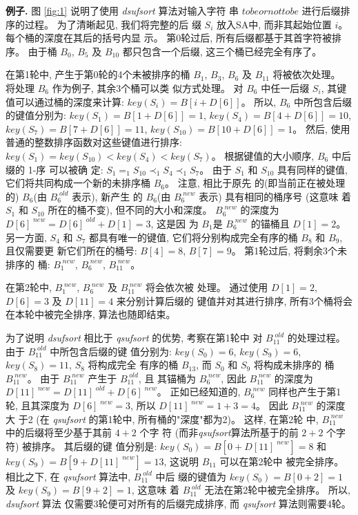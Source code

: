 \textbf{例子.} 图 \ref{fig:1} 说明了使用 \emph{dsufsort} 算法对输入字符
串 $tobeornottobe$ 进行后缀排序的过程。 为了清晰起见, 我们将完整的后
缀 $S_i$ 放入SA中, 而非其起始位置 $i$。 每个桶的深度在其后的括号内显
示。 第0轮过后, 所有后缀都基于其首字符被排序。 由于桶 $B_0$,
$B_5$ 及 $B_{10}$ 都只包含一个后缀, 这三个桶已经完全有序了。

在第1轮中, 产生于第0轮的4个未被排序的桶 $B_1$, $B_3$,
$B_6$ 及 $B_{11}$ 将被依次处理。 将处理 $B_6$ 作为例子, 其余3个桶可以类
似方式处理。 对 $B_6$ 中任一后缀 $S_i$, 其键值可以通过桶的深度来计算:
$key(S_i) = B[i+D[6]]$。 所以, $B_6$ 中所包含后缀的键值分别为:
$key(S_1) = B[1+D[6]] = 1$, $key(S_4) = B[4+D[6]] = 10$,
$key(S_7) = B[7+D[6]] = 11$, $key(S_{10}) = B[10+D[6]] = 1$。 然后, 使用
普通的整数排序函数对这些键值进行排序: $key(S_1) = key(S_{10}) <
key(S_4) < key(S_7)$。  根据键值的大小顺序, $B_6$ 中后缀的 1-序 可以被确
定: $S_1 =_ 1 S_{10} \prec_1 S_4 \prec_1 S_7$。 由于 $S_1$ 和 $S_{10}$
具有同样的键值, 它们将共同构成一个新的未排序桶 $B_6$。 注意, 相比于原先
的(即当前正在被处理的) $B_6$(由 $B_6^{\;old}$ 表示), 新产生
的 $B_6$(由 $B_6^{\;new}$ 表示) 具有相同的桶序号 (这意味
着 $S_1$ 和 $S_{10}$ 所在的桶不变), 但不同的大小和深度。 $B_6^{\;new}$
的深度为 $D[6]^{\;new} = D[6]^{\;old} + D[1] = 3$, 这是因
为 $B_1$是 $B_6^{\;new}$ 的锚桶且 $D[1] = 2$。 另一方面, $S_4$ 和 $S_7$
都具有唯一的键值, 它们将分别构成完全有序的桶 $B_8$ 和 $B_9$, 且仅需要更
新它们所在的桶号: $B[4] = 8$, $B[7] = 9$。 第1轮过后, 将剩余3个未排序的
桶: $B_1^{\;new}$, $B_6^{\;new}$, $B_{11}^{\;new}$。

在第2轮中, $B_1^{\;new}$, $B_6^{\;new}$ 及 $B_{11}^{\;new}$ 将会依次被
处理。 通过使用 $D[1] = 2$, $D[6] = 3$ 及 $D[11] = 4$ 来分别计算后缀的
键值并对其进行排序, 所有3个桶将会在本轮中被完全排序, 算法也随即结束。

为了说明 \emph{dsufsort} 相比于 \emph{qsufsort} 的优势, 考察在第1轮中
对 $B_{11}^{\;old}$ 的处理过程。 由于 $B_{11}^{\;old}$ 中所包含后缀的键
值分别为: $key(S_0)=6$, $key(S_9)=6$, $key(S_8) = 11$, $S_8$ 将构成完全
有序的桶 $B_{13}$, 而 $S_0$ 和 $S_9$ 将构成未排序的
桶 $B_{11}^{\;new}$。 由于 $B_{11}^{\;new}$ 产生于 $B_{11}^{\;old}$, 且
其锚桶为 $B_6^{\;new}$, 因此 $B_{11}^{\;new}$ 的深度为
$D[11]^{\;new} = D[11]^{\;old} + D[6]^{\;new}$。 正如已经知道的,
$B_6^{\;new}$ 同样也产生于第1轮, 且其深度为 $D[6]^{\;new} =
3$, 所以 $D[11]^{\;new} = 1 + 3 = 4$。 因此 $B_{11}^{\;new}$ 的深度大
于2 (在 \emph{qsufsort} 的第1轮中, 所有桶的"深度"都为2)。 这样, 在第2轮
中, $B_{11}^{\;new}$ 中的后缀将至少基于其前 $4+2$ 个字
符 (而非\emph{qsufsort}算法所基于的前 $2+2$ 个字符) 被排序。 其后缀的键
值分别是: $key(S_0)=B[0+D[11] ^{\;new}]=
8$ 和 $key(S_9)=B[9+D[11]^{\;new}]= 13$, 这说明 $B_{11}$ 可以在第2轮中
被完全排序。 相比之下, 在 \emph{qsufsort} 算法中, $B_{11}^{\;old}$ 中后
缀的键值为 $key(S_0) = B[0+2] = 1$ 及 $key(S_9) = B[9+2] = 1$, 这意味
着 $B_{11}^{\;old}$ 无法在第2轮中被完全排序。 所以, \emph{dsufsort} 算法
仅需要3轮便可对所有的后缀完成排序, 而 \emph{qsufsort} 算法则需要4轮。

